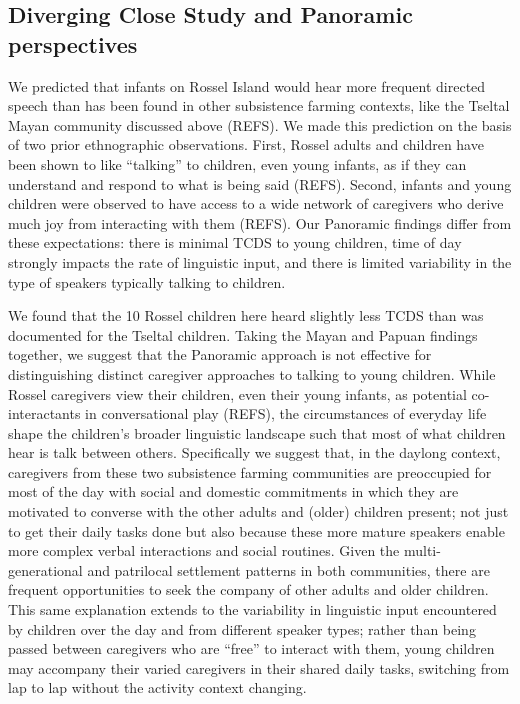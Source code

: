 \documentclass[,man,floatsintext]{apa6}
\begin{document}
\subsection{Diverging Close Study and Panoramic
perspectives}\label{diverging-close-study-and-panoramic-perspectives}

We predicted that infants on Rossel Island would hear more frequent
directed speech than has been found in other subsistence farming
contexts, like the Tseltal Mayan community discussed above (REFS). We
made this prediction on the basis of two prior ethnographic
observations. First, Rossel adults and children have been shown to like
\enquote{talking} to children, even young infants, as if they can
understand and respond to what is being said (REFS). Second, infants and
young children were observed to have access to a wide network of
caregivers who derive much joy from interacting with them (REFS). Our
Panoramic findings differ from these expectations: there is minimal TCDS
to young children, time of day strongly impacts the rate of linguistic
input, and there is limited variability in the type of speakers
typically talking to children.

We found that the 10 Rossel children here heard slightly less TCDS than
was documented for the Tseltal children. Taking the Mayan and Papuan
findings together, we suggest that the Panoramic approach is not
effective for distinguishing distinct caregiver approaches to talking to
young children. While Rossel caregivers view their children, even their
young infants, as potential co-interactants in conversational play
(REFS), the circumstances of everyday life shape the children's broader
linguistic landscape such that most of what children hear is talk
between others. Specifically we suggest that, in the daylong context,
caregivers from these two subsistence farming communities are
preoccupied for most of the day with social and domestic commitments in
which they are motivated to converse with the other adults and (older)
children present; not just to get their daily tasks done but also
because these more mature speakers enable more complex verbal
interactions and social routines. Given the multi-generational and
patrilocal settlement patterns in both communities, there are frequent
opportunities to seek the company of other adults and older children.
This same explanation extends to the variability in linguistic input
encountered by children over the day and from different speaker types;
rather than being passed between caregivers who are \enquote{free} to
interact with them, young children may accompany their varied caregivers
in their shared daily tasks, switching from lap to lap without the
activity context changing.
\end{document}
